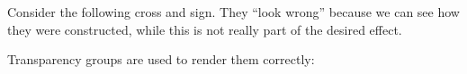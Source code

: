   







Consider the following cross and sign. They ``look wrong'' because we
can see how they were constructed, while this is not really part of
the desired effect. 

\begin{codeexample}[]
\end{codeexample}

\begin{codeexample}[]
\end{codeexample}

Transparency groups are used to render them correctly:

